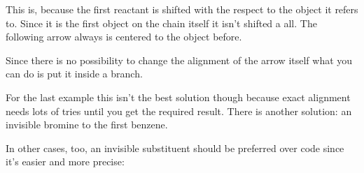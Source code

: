 \documentclass[toc=index,DIV10]{cnpkgdoc}
\begin{document}
\begin{beispiel}
 \makevisible
 \begin{rxn}
  \arrow{}{}
 \end{rxn}
\end{beispiel}
This is, because the first reactant is shifted with the respect to the object it
refers to. Since it is the first object on the chain itself it isn't shifted a
all. The following arrow always is centered to the object before.
\begin{beispiel}
 \makevisible
 \begin{rxn}
  \chemand
  \arrow{}{}
 \end{rxn}
\end{beispiel}
Since there is no possibility to change the alignment of the arrow itself what
you can do is put it inside a branch.
\begin{beispiel}
 \makevisible
 \begin{rxn}
  \chemand
  \branch[,,yshift=-1em]{\arrow{}{}}
 \end{rxn}
 \begin{rxn}
  \branch[,,yshift=1em]{\arrow{}{}}
 \end{rxn}
\end{beispiel}
For the last example this isn't the best solution though because exact alignment
needs lots of tries until you get the required result. There is another solution:
an invisible bromine to the first benzene.
\begin{beispiel}
 \makevisible
 \begin{rxn}
  \arrow{}{}
 \end{rxn}
\end{beispiel}
In other cases, too, an invisible substituent should be preferred over \TikZ code
since it's easier and more precise:
\end{document}
